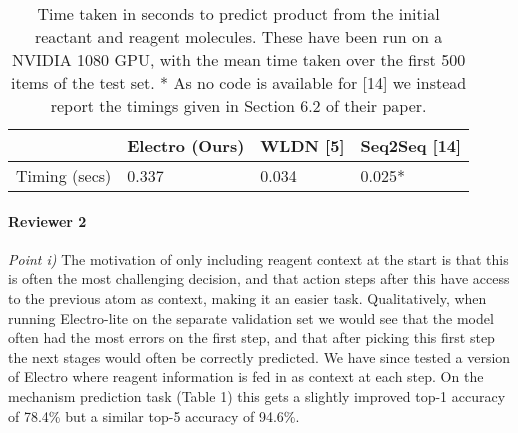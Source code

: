 \documentclass{article}
\begin{document}
 
 

\begin{table}[h]
  \caption{Time taken in seconds to predict product from the initial reactant and reagent molecules.
  These have been run on a NVIDIA 1080 GPU, with the mean time taken over the first 500 items of the test set.
  * As no code is available for [14] we instead report the timings given in Section 6.2 of their paper.
  }
  \label{table:timings}
  \centering
  \begin{tabular}{llll}
    \toprule
    & Electro (Ours) & WLDN [5] & Seq2Seq [14]  \\
    \midrule
    Timing (secs) & 0.337   & 0.034 &  0.025*     \\
    \bottomrule
  \end{tabular}
\end{table}

\paragraph{Reviewer 2}
\emph{Point i)}
The motivation of only including reagent context at the start is that this is often the most challenging decision, and that action steps after this have access to the previous atom as context, making it an easier task.
Qualitatively, when running Electro-lite on the separate validation set we would see that the model often had the most errors on the first step, and that after picking this first step the next stages would often be correctly predicted.
We have since tested a version of Electro where reagent information is fed in as context at each step. 
On the mechanism prediction task (Table 1) this gets a slightly improved top-1 accuracy of 78.4\% but a similar top-5 accuracy of 94.6\%.

\end{document}
